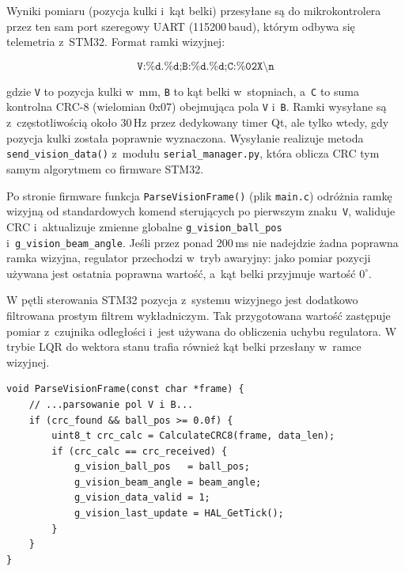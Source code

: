 Wyniki pomiaru (pozycja kulki i~kąt belki) przesyłane są do mikrokontrolera
przez ten sam port szeregowy UART (115200\,baud), którym odbywa się telemetria
z~STM32.
Format ramki wizyjnej:

\begin{equation*}
  \texttt{V:\%d.\%d;B:\%d.\%d;C:\%02X\textbackslash n}
\end{equation*}

gdzie \texttt{V} to pozycja kulki w~mm, \texttt{B} to kąt belki w~stopniach,
a~\texttt{C} to suma kontrolna CRC-8 (wielomian 0x07) obejmująca pola
\texttt{V} i~\texttt{B}.
Ramki wysyłane są z~częstotliwością około 30\,Hz przez dedykowany timer Qt, ale
tylko wtedy, gdy pozycja kulki została poprawnie wyznaczona. Wysyłanie realizuje
metoda \texttt{send\_vision\_data()} z~modułu \texttt{serial\_manager.py}, która
oblicza CRC tym samym algorytmem co firmware STM32.

Po stronie firmware funkcja \texttt{ParseVisionFrame()} (plik \texttt{main.c})
odróżnia ramkę wizyjną od standardowych komend sterujących po pierwszym znaku~\texttt{V},
waliduje CRC i~aktualizuje zmienne globalne \texttt{g\_vision\_ball\_pos}
i~\texttt{g\_vision\_beam\_angle}.
Jeśli przez ponad 200\,ms nie nadejdzie żadna poprawna ramka wizyjna,
regulator przechodzi w~tryb awaryjny: jako pomiar pozycji używana jest ostatnia
poprawna wartość, a~kąt belki przyjmuje wartość $0^{\circ}$.

W pętli sterowania STM32 pozycja z~systemu wizyjnego jest dodatkowo filtrowana
prostym filtrem wykładniczym. Tak przygotowana wartość zastępuje pomiar z~czujnika
odległości i~jest używana do obliczenia uchybu regulatora. W trybie LQR do wektora
stanu trafia również kąt belki przesłany w~ramce wizyjnej.

\begin{lstlisting}[style=cstyle, caption={Fragment funkcji ParseVisionFrame() (main.c) -- parsowanie i walidacja CRC}]
void ParseVisionFrame(const char *frame) {
    // ...parsowanie pol V i B...
    if (crc_found && ball_pos >= 0.0f) {
        uint8_t crc_calc = CalculateCRC8(frame, data_len);
        if (crc_calc == crc_received) {
            g_vision_ball_pos   = ball_pos;
            g_vision_beam_angle = beam_angle;
            g_vision_data_valid = 1;
            g_vision_last_update = HAL_GetTick();
        }
    }
}
\end{lstlisting}
